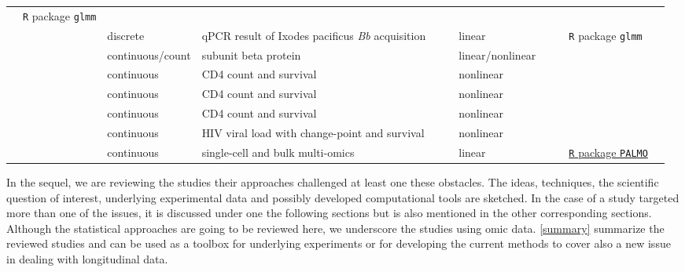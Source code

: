 \documentclass[]{article}
\newcommand{\cmark}{\ding{51}}%
\newcommand{\xmark}{\ding{55}}%
\begin{document}
\begin{table}
\begin{center}
\begin{minipage}{.7\textheight}
\begin{scriptsize}
\begin{tabular}{lcllcclcclc}
							&	\texttt{R} package \texttt{glmm}				&	\xmark\\
							\cite{Ring2022}							&	\xmark	&	discrete					&qPCR result of Ixodes pacificus \textit{Bb} 
							acquisition	&	\cmark	&	\xmark	&	linear&\xmark	&	\xmark	
							&	\texttt{R} package \texttt{glmm}				&	\cmark\\
							\cite{Marshall2000}					&	\cmark	&	continuous/count	&	subunit beta protein 
							&	\cmark	&	\cmark	&	linear/nonlinear&\xmark	&	\xmark	
							&	\xmark	&	\xmark\\
							\cite{Tsiatis1995}					&	\xmark	&	continuous	&	CD4 count and survival 
							&	\cmark	&	\cmark	&	nonlinear&\cmark	&	\xmark	
							&	\xmark	&	\xmark\\
							\cite{WulfsohnTsiatis1997}					&	\xmark	&	continuous	&	CD4 count and survival 
							&	\cmark	&	\cmark	&	nonlinear&\cmark	&	\xmark	
							&	\xmark	&	\xmark\\
							\cite{WangTaylor2001}&	\xmark	&	continuous	&	CD4 count and survival
							&	\cmark	&	\cmark	&	nonlinear&\xmark	&	\xmark	
							&	\xmark	&	\xmark\\
							\cite{Ghosh2011}					&	\xmark	&	continuous	&	HIV viral load with change-point and survival		&	\cmark	&	\cmark	&	nonlinear&\cmark	&	\xmark	
							&	\xmark	&	\xmark\\
							\cite{Vasaikaretal2023}		&	\xmark	&	continuous	&	single-cell and bulk multi-omics		&	\cmark	&	\cmark	&	
							linear&\cmark	&	\xmark	
							&	\href{https://github.com/aifimmunology/PALMO}{\texttt{R} package \texttt{PALMO}}	&	\cmark\\
						\end{tabular}
					\end{scriptsize}
				\end{minipage}
			\end{center}
		\end{table}
		
		In  the sequel, we are reviewing the studies their approaches challenged at least one these obstacles. The ideas, techniques,  the scientific question of interest, underlying experimental data and possibly developed computational tools are sketched. In the case of a study targeted more than one of the issues, it is discussed under one the following sections but is also mentioned in the other corresponding sections. Although the statistical approaches are going to be reviewed here, we underscore the studies using omic data. \autoref{summary} summarize the reviewed studies and can be used as a toolbox for underlying experiments or for developing the current methods to cover also a new issue in dealing with longitudinal data. 
		
\end{document}
